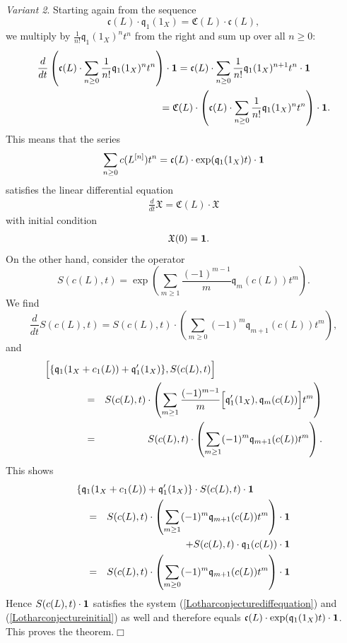 \documentclass[twoside,11pt]{article}
\newcommand{\qed}{\hspace*{\fill}$\Box$\vspace{2ex}}
\newcommand{\beeq}[1]{\begin{eqnarray}\label{#1}}
\newcommand{\eneq}{\end{eqnarray}}
\newcommand{\gothc}{{\mathfrak c}}
\newcommand{\gothq}{{\mathfrak q}}
\newcommand{\gothC}{{\mathfrak C}}
\newcommand{\gothX}{{\mathfrak X}}
\newcommand{\cc}{\gothc}
\newcommand{\qq}{\gothq}
\newcommand{\vacuum}{{\bf 1}}
\begin{document}
{\em Variant 2}. Starting again from the sequence
$$\cc(L)\cdot\qq_1(1_X)=\gothC(L)\cdot\cc(L),$$
we multiply by $\frac{1}{n!}\qq_1(1_X)^nt^n$ from the right and sum up over all $n\geq0$:
\begin{eqnarray*}
\frac{d}{dt}\left(\cc(L)\cdot\sum_{n\geq0}\frac{1}{n!}\qq_1(1_X)^n t^n
\right)\cdot\vacuum=
\cc(L)\cdot\sum_{n\geq0}\frac{1}{n!}\qq_1(1_X)^{n+1}t^n\cdot\vacuum\qquad\\
=\gothC(L)\cdot\left(\cc(L)\cdot
\sum_{n\geq0}\frac{1}{n!}\qq_1(1_X)^n t^n\right)\cdot\vacuum.
\end{eqnarray*}
This means that the series
$$\sum_{n\geq0}c(L^{[n]})t^n=\cc(L)\cdot\exp(\qq_1(1_X)t)\cdot\vacuum$$
satisfies the linear differential equation
\beeq{Lotharconjecturediffequation}
\frac{d}{dt}\gothX=\gothC(L)\cdot\gothX
\eneq
with initial condition
\beeq{Lotharconjectureinitial}\quad\gothX(0)=\vacuum.\eneq
On the other hand, consider the operator
$$S(c(L),t)=\exp\left(\sum_{m\geq1}\frac{(-1)^{m-1}}{m}\qq_m(c(L))t^m\right).$$
We find
$$\frac{d}{dt}S(c(L),t)=S(c(L),t)\cdot \left(\sum_{m\geq0}(-1)^{m}\qq_{m+1}(c(L))t^m\right),$$
and
\begin{eqnarray*}
\lefteqn{\Big[\{\qq_1(1_X+c_1(L))+\qq'_1(1_X)\},S(c(L),t)\Big]}\hspace{4em}\\
&=&S(c(L),t)\cdot\left(\sum_{m\geq1}\frac{(-1)^{m-1}}{m}\Big[
\qq_1'(1_X),\qq_m(c(L))\Big]t^m\right)\\
&=&S(c(L),t)\cdot\left(\sum_{m\geq1}(-1)^m\qq_{m+1}(c(L))t^m\right).
\end{eqnarray*}
This shows
\begin{eqnarray*}
\lefteqn{\{\qq_1(1_X+c_1(L))+\qq'_1(1_X)\}\cdot S(c(L),t)\cdot\vacuum}\hspace{1em}\\
&=&S(c(L),t)\cdot\left(\sum_{m\geq1}(-1)^m\qq_{m+1}(c(L))t^m\right)\cdot\vacuum
\\
&&+S(c(L),t)\cdot\qq_1(c(L))\cdot\vacuum\\
&=&S(c(L),t)\cdot\left(\sum_{m\geq0}(-1)^m\qq_{m+1}(c(L))t^m\right)\cdot\vacuum
\end{eqnarray*}
Hence $S(c(L),t)\cdot\vacuum$ satisfies the system
(\ref{Lotharconjecturediffequation}) and
(\ref{Lotharconjectureinitial}) as well and therefore equals $\cc(L)\cdot\exp(\qq_1(1_X)t)\cdot\vacuum$.
This proves the theorem.\qed



\end{document}
